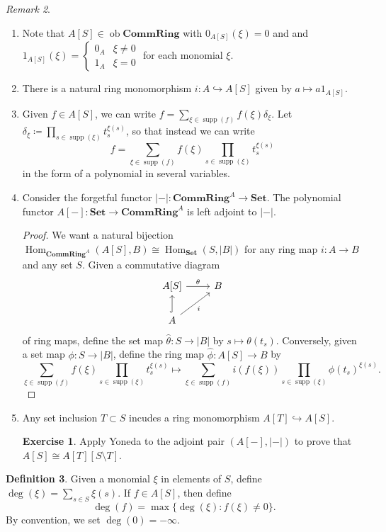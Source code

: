 \documentclass[10pt,letterpaper,cm]{nupset}
\theoremstyle{definition}
\newtheorem{definition}{Definition}[subsection]
\theoremstyle{theorem}
\newtheorem{exercise}[definition]{Exercise}
\theoremstyle{remark}
\newtheorem{remark}[definition]{Remark}
\newcommand{\1}{\mathbf{1}}
\newcommand{\0}{\vec 0}
\DeclareMathOperator{\ob}{ob}
\DeclareMathOperator{\Hom}{Hom}
\DeclareMathOperator{\supp}{supp}
\begin{document}
\begin{remark} $ $
\begin{enumerate}
\item Note that $A[S] \in  \ob \mathbf{CommRing}$ with $0_{A[S]}(\xi) =0$ and and $1_{A[S]}(\xi) = \begin{cases} 0_A & \xi \ne 0 \\ 1_A & \xi =0   \end{cases}$ for each monomial $\xi$. 
\item There is  a natural ring monomorphism $i : A \hookrightarrow A[S]$ given by $a \mapsto a1_{A[S]}$.
\item Given $f\in A[S]$, we can write $f = \sum_{\xi \in \supp(f)} f(\xi)\delta_{\xi}$. Let $ \delta_{\xi}\coloneqq \prod_{s\in \supp(\xi)}t_s^{\xi(s)}$, so that instead we can write $$ f = \sum_{\xi \in \supp(f)} f(\xi)\prod_{s\in \supp(\xi)}t_s^{\xi(s)} $$ in the form of a polynomial in several variables.  
\item Consider the forgetful functor $\lvert - \rvert: \mathbf{CommRing}^A \to \mathbf{Set}$. The polynomial functor $A[-]: \mathbf{Set} \to \mathbf{CommRing}^A $ is left adjoint to $\lvert - \rvert$.
\begin{proof}
We want a natural bijection $\Hom_{\mathbf{CommRing}^A}(A[S], B) \cong \Hom_{\mathbf{Set}}(S, |B|)$ for any ring map $i: A\to B$ and any set $S$. Given a commutative diagram  
\[
\begin{tikzcd}
{A[S]} \arrow[r, "\theta"] & B \\
A \arrow[u, hook] \arrow[ru, "i"'] & 
\end{tikzcd}
\] of ring maps, define the set map $\hat{\theta} : S \to |B|$ by $s\mapsto \theta(t_s)$. Conversely, given a set map $\phi : S\to |B|$, define the ring map $\hat{\phi} : A[S] \to B$ by $$ \sum_{\xi \in \supp(f)} f(\xi)\prod_{s\in \supp(\xi)}t_s^{\xi(s)}  \mapsto \sum_{\xi \in \supp(f)} i(f(\xi))\prod_{s\in \supp(\xi)}\phi(t_s)^{\xi(s)}  .$$
\end{proof}
\item Any set inclusion $T \subset S$ incudes a ring monomorphism $A[T] \hookrightarrow A[S]$.
\begin{exercise}
Apply Yoneda to the adjoint pair $(A[-], \lvert - \rvert)$ to prove that $A[S]\cong A[T][S\setminus T]$.
\end{exercise}
\end{enumerate}
\end{remark}

\begin{definition}
Given a monomial $\xi$ in elements of $S$, define $\deg(\xi) = \sum_{s\in S} \xi(s).$ If $f\in A[S]$, then define $$ \deg(f)  = \max \{ \deg (\xi) : f(\xi) \ne 0\}  .$$ By convention, we set $\deg(0) = {-}\infty$.
\end{definition}
\end{document}
